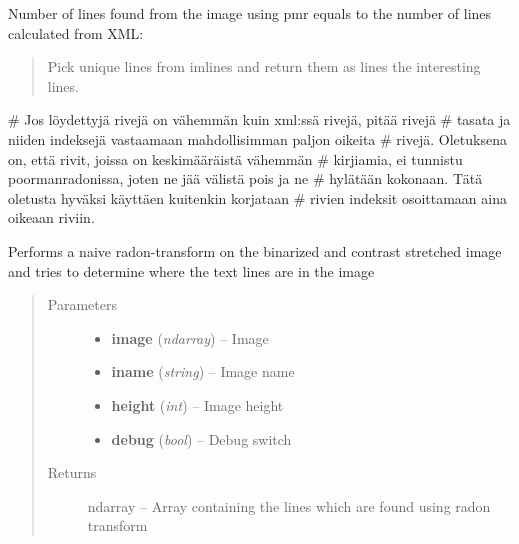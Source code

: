 \documentclass[letterpaper,10pt,english]{sphinxmanual}
\begin{document}
\begin{fulllineitems}
\begin{fulllineitems}
\begin{description}
\begin{quote}
\begin{description}
\end{description}
\end{quote}

Number of lines found from the image using pmr equals to
the number of lines calculated from XML:
\begin{quote}

Pick unique lines from imlines and return them as lines 
the interesting lines.
\end{quote}

\end{description}

\# Jos löydettyjä rivejä on vähemmän kuin xml:ssä rivejä, pitää rivejä
\# tasata ja niiden indeksejä vastaamaan mahdollisimman paljon oikeita
\# rivejä. Oletuksena on, että rivit, joissa on keskimääräistä vähemmän
\# kirjiamia, ei tunnistu poormanradonissa, joten ne jää välistä pois ja ne
\# hylätään kokonaan. Tätä oletusta hyväksi käyttäen kuitenkin korjataan
\# rivien indeksit osoittamaan aina oikeaan riviin.

\end{fulllineitems}


\begin{fulllineitems}
\label{code:osearch.OratUtils.poormanradon}
Performs a naive radon-transform on the binarized and contrast stretched image and 
tries to determine where the text lines are in the image
\begin{quote}\begin{description}
\item[{Parameters}] \leavevmode\begin{itemize}
\item {} 
\textbf{image} (\emph{ndarray}) -- Image

\item {} 
\textbf{iname} (\emph{string}) -- Image name

\item {} 
\textbf{height} (\emph{int}) -- Image height

\item {} 
\textbf{debug} (\emph{bool}) -- Debug switch

\end{itemize}

\item[{Returns}] \leavevmode
ndarray -- Array containing the lines which are found using radon transform


\end{description}
\end{quote}
\end{fulllineitems}
\end{fulllineitems}
\end{document}
